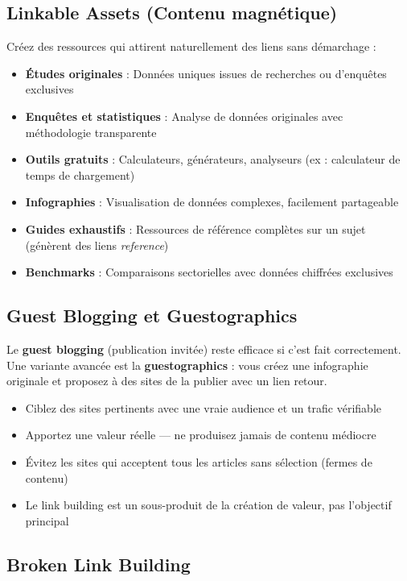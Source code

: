\documentclass[12pt,a4paper,twoside]{report}
\newcommand{\keyword}[1]{\textbf{\textcolor{googleblue}{#1}}}
\begin{document}
\subsection{Linkable Assets (Contenu magnétique)}

Créez des ressources qui attirent naturellement des liens sans démarchage :

\begin{itemize}
    \item \textbf{Études originales} : Données uniques issues de recherches ou d'enquêtes exclusives
    \item \textbf{Enquêtes et statistiques} : Analyse de données originales avec méthodologie transparente
    \item \textbf{Outils gratuits} : Calculateurs, générateurs, analyseurs (ex : calculateur de temps de chargement)
    \item \textbf{Infographies} : Visualisation de données complexes, facilement partageable
    \item \textbf{Guides exhaustifs} : Ressources de référence complètes sur un sujet (génèrent des liens \textit{reference})
    \item \textbf{Benchmarks} : Comparaisons sectorielles avec données chiffrées exclusives
\end{itemize}

\subsection{Guest Blogging et Guestographics}

Le \keyword{guest blogging} (publication invitée) reste efficace si c'est fait correctement. Une variante avancée est la \keyword{guestographics} : vous créez une infographie originale et proposez à des sites de la publier avec un lien retour.

\begin{itemize}
    \item Ciblez des sites pertinents avec une vraie audience et un trafic vérifiable
    \item Apportez une valeur réelle — ne produisez jamais de contenu médiocre
    \item Évitez les sites qui acceptent tous les articles sans sélection (fermes de contenu)
    \item Le link building est un sous-produit de la création de valeur, pas l'objectif principal
\end{itemize}

\subsection{Broken Link Building}
\end{document}
